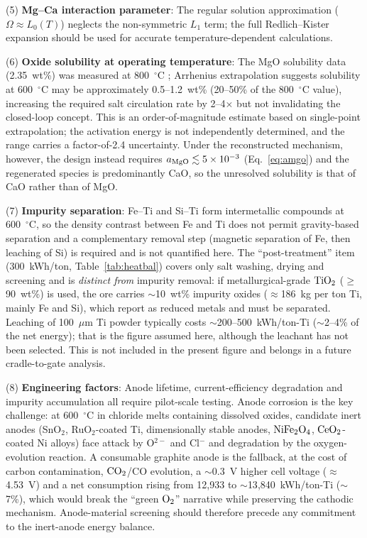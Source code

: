 \documentclass[pdflatex,sn-basic,Numbered]{sn-jnl}
\begin{document}
(5) \textbf{Mg--Ca interaction parameter}: The regular solution approximation ($\Omega \approx L_0(T)$) neglects the non-symmetric $L_1$ term; the full Redlich--Kister expansion \cite{zhang2008mgce} should be used for accurate temperature-dependent calculations.

(6) \textbf{Oxide solubility at operating temperature}: The MgO solubility data (2.35~wt\%) was measured at 800~$^{\circ}$C \cite{morita2004}; Arrhenius extrapolation suggests solubility at 600~$^{\circ}$C may be approximately 0.5--1.2~wt\% (20--50\% of the 800~$^{\circ}$C value), increasing the required salt circulation rate by 2--4$\times$ but not invalidating the closed-loop concept. This is an order-of-magnitude estimate based on single-point extrapolation; the activation energy is not independently determined, and the range carries a factor-of-2.4 uncertainty. Under the reconstructed mechanism, however, the design instead requires $a_{\ce{MgO}} \lesssim 5\times10^{-3}$ (Eq.~\ref{eq:amgo}) and the regenerated species is predominantly CaO, so the unresolved solubility is that of CaO rather than of MgO.

(7) \textbf{Impurity separation}: Fe--Ti and Si--Ti form intermetallic compounds at 600~$^{\circ}$C, so the density contrast between Fe and Ti does not permit gravity-based separation and a complementary removal step (magnetic separation of Fe, then leaching of Si) is required and is not quantified here. The ``post-treatment'' item (300~kWh/ton, Table~\ref{tab:heatbal}) covers only salt washing, drying and screening and is \emph{distinct from} impurity removal: if metallurgical-grade $\ce{TiO2}$ ($\geq$90~wt\%) is used, the ore carries $\sim$10~wt\% impurity oxides ($\approx$186~kg per ton Ti, mainly Fe and Si), which report as reduced metals and must be separated. Leaching of 100~$\mu$m Ti powder typically costs $\sim$200--500~kWh/ton-Ti ($\sim$2--4\% of the net energy); that is the figure assumed here, although the leachant has not been selected. This is not included in the present figure and belongs in a future cradle-to-gate analysis.

(8) \textbf{Engineering factors}: Anode lifetime, current-efficiency degradation and impurity accumulation all require pilot-scale testing. Anode corrosion is the key challenge: at 600~$^{\circ}$C in chloride melts containing dissolved oxides, candidate inert anodes (SnO$_2$, RuO$_2$-coated Ti, dimensionally stable anodes, $\ce{NiFe2O4}$, $\ce{CeO2}$-coated Ni alloys) face attack by O$^{2-}$ and Cl$^-$ and degradation by the oxygen-evolution reaction. A consumable graphite anode is the fallback, at the cost of carbon contamination, $\ce{CO2}$/CO evolution, a $\sim$0.3~V higher cell voltage ($\approx$4.53~V) and a net consumption rising from 12{,}933 to $\sim$13{,}840~kWh/ton-Ti ($\sim$7\%), which would break the ``green $\ce{O2}$'' narrative while preserving the cathodic mechanism. Anode-material screening should therefore precede any commitment to the inert-anode energy balance.
\end{document}
